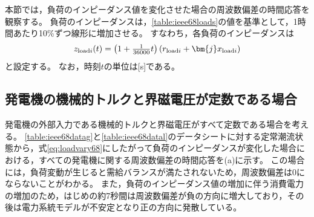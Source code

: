 \documentclass[tombow,dvipdfmx]{corona-a5-1.1}
\begin{document}
本節では，負荷のインピーダンス値を変化させた場合の周波数偏差の時間応答を観察する。
負荷のインピーダンスは，\ref{table:ieee68loads}の値を基準として，1時間あたり10\%ずつ線形に増加させる。
すなわち，各負荷のインピーダンスは
\begin{align}\label{eq:loadvary68}
z_{{\rm load}i}(t) = \left(1+\tfrac{1}{36000}t \right) \left( r_{{\rm load}i} + \bm{j} x_{{\rm load}i} \right)
\end{align}
と設定する。
なお，時刻$t$の単位は[s]である。

\subsection{発電機の機械的トルクと界磁電圧が定数である場合}\label{sec:constPV}

発電機の外部入力である機械的トルクと界磁電圧がすべて定数である場合を考える。
\ref{table:ieee68datag}と\ref{table:ieee68datal}のデータシートに対する定常潮流状態から，式\ref{eq:loadvary68}にしたがって負荷のインピーダンスが変化した場合における，すべての発電機に関する周波数偏差の時間応答を(a)に示す。
この場合には，負荷変動が生じると需給バランスが満たされないため，周波数偏差は0にならないことがわかる。
また，負荷のインピーダンス値の増加に伴う消費電力の増加のため，はじめの約7秒間は周波数偏差が負の方向に増大しており，その後は電力系統モデルが不安定となり正の方向に発散している。
\end{document}
